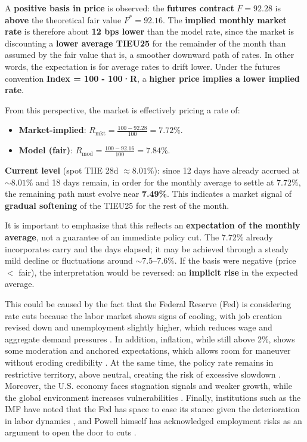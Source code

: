 \documentclass[10pt,a4paper]{article} %
\begin{document}
A \textbf{positive basis in price} is observed: the \textbf{futures contract} $F=92.28$ is \textbf{above} the theoretical fair value $F^*=92.16$. The \textbf{implied monthly market rate} is therefore about \textbf{12 bps lower} than the model rate, since the market is discounting a \textbf{lower average TIEU25} for the remainder of the month than assumed by the fair value that is, a smoother downward path of rates. In other words, the expectation is for average rates to drift lower. Under the futures convention \textbf{Index = 100 - 100·R}, a \textbf{higher price implies a lower implied rate}. 

From this perspective, the market is effectively pricing a rate of:
\begin{itemize}
  \item \textbf{Market-implied}: $R_{\text{mkt}} = \tfrac{100-92.28}{100} = \mathbf{7.72\%}$.
  \item \textbf{Model (fair)}: $R_{\text{mod}} = \tfrac{100-92.16}{100} = \mathbf{7.84\%}$.
\end{itemize}

\textbf{Current level} (spot TIIE 28d $\approx 8.01\%$): since 12 days have already accrued at $\sim8.01\%$ and 18 days remain, in order for the monthly average to settle at $7.72\%$, the remaining path must evolve near \textbf{7.49\%}. This indicates a market signal of \textbf{gradual softening} of the TIEU25 for the rest of the month.

It is important to emphasize that this reflects an \textbf{expectation of the monthly average}, not a guarantee of an immediate policy cut. The 7.72\% already incorporates carry and the days elapsed; it may be achieved through a steady mild decline or fluctuations around $\sim7.5$--$7.6\%$. If the basis were negative (price $<$ fair), the interpretation would be reversed: an \textbf{implicit rise} in the expected average.

This could be caused by the fact that the Federal Reserve (Fed) is considering rate cuts because the labor market shows signs of cooling, with job creation revised down and unemployment slightly higher, which reduces wage and aggregate demand pressures \citep{reuters2025a}. In addition, inflation, while still above 2\%, shows some moderation and anchored expectations, which allows room for maneuver without eroding credibility \citep{ycharts2025}. At the same time, the policy rate remains in restrictive territory, above neutral, creating the risk of excessive slowdown \citep{ycharts2025}. Moreover, the U.S. economy faces stagnation signals and weaker growth, while the global environment increases vulnerabilities \citep{reuters2025b}. Finally, institutions such as the IMF have noted that the Fed has space to ease its stance given the deterioration in labor dynamics \citep{reuters2025c}, and Powell himself has acknowledged employment risks as an argument to open the door to cuts \citep{reuters2025d}.
\end{document}
